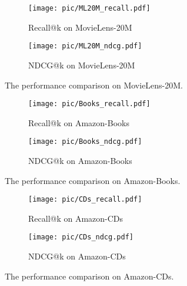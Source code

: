\documentclass[sigconf]{acmart}
\begin{document}
\begin{figure}[t!]
    \centering
    \begin{subfigure}[t]{0.25\textwidth}
        \centering
        \texttt{[image: pic/ML20M\_recall.pdf]}
        \caption{\label{fig:ml20m_recall} Recall@k on MovieLens-20M}
    \end{subfigure}\begin{subfigure}[t]{0.25\textwidth}
        \centering
        \texttt{[image: pic/ML20M\_ndcg.pdf]}
        \caption{\label{fig:ml20m_ndcg} NDCG@k on MovieLens-20M}
    \end{subfigure}
    \caption{\label{fig:ml20m}The performance comparison on MovieLens-20M.}
\vspace{-0.3cm}
\end{figure}

\begin{figure}[t!]
    \centering
    \begin{subfigure}[t]{0.25\textwidth}
        \centering
        \texttt{[image: pic/Books\_recall.pdf]}
        \caption{\label{fig:Books_recall} Recall@k on Amazon-Books}
    \end{subfigure}\begin{subfigure}[t]{0.25\textwidth}
        \centering
        \texttt{[image: pic/Books\_ndcg.pdf]}
        \caption{\label{fig:Books_ndcg} NDCG@k on Amazon-Books}
    \end{subfigure}
    \caption{\label{fig:books}The performance comparison on Amazon-Books.}
\vspace{-0.3cm}
\end{figure}

\begin{figure}[t!]
    \centering
    \begin{subfigure}[t]{0.25\textwidth}
        \centering
        \texttt{[image: pic/CDs\_recall.pdf]}
        \caption{\label{fig:CDs_recall} Recall@k on Amazon-CDs}
    \end{subfigure}\begin{subfigure}[t]{0.25\textwidth}
        \centering
        \texttt{[image: pic/CDs\_ndcg.pdf]}
        \caption{\label{fig:CDs_ndcg} NDCG@k on Amazon-CDs}
    \end{subfigure}
    \caption{\label{fig:cds}The performance comparison on Amazon-CDs.}
\vspace{-0.3cm}
\end{figure}
\end{document}
